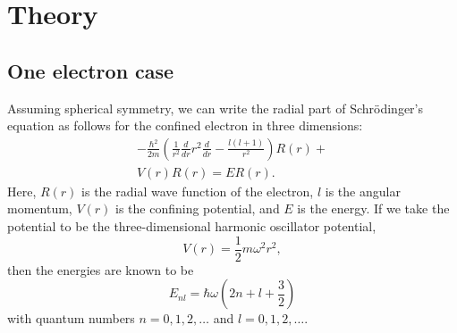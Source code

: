 \documentclass[aps,prc,reprint]{revtex4-1}
\begin{document}
\section{Theory}
\label{sec:theory}

    \subsection{One electron case}
    \label{sub:oneelec}
        Assuming spherical symmetry, we can write the radial part of Schr\"odinger's equation as follows for the confined electron in three dimensions:
        \begin{multline}
            -\frac{\hbar^2}{2m} \left( \frac{1}{r^2} \frac{d}{dr} r^2 \frac{d}{dr} - \frac{l(l+1)}{r^2} \right) R(r) +{} \\ V(r)R(r) = ER(r).  \label{eq:genschro}
        \end{multline}
        Here, $R(r)$ is the radial wave function of the electron, $l$ is the angular momentum, $V(r)$ is the confining potential, and $E$ is the energy. If we take the potential to be the three-dimensional harmonic oscillator potential,
        \begin{equation}
            V(r) = \frac{1}{2} m \omega^2 r^2,
        \end{equation}
        then the energies are known to be
        \begin{equation}
            E_{nl} = \hbar\omega \left( 2n + l + \frac{3}{2} \right)
        \end{equation}
        with quantum numbers $n=0,1,2,\dots$ and $l=0,1,2,\dots$.
\end{document}
